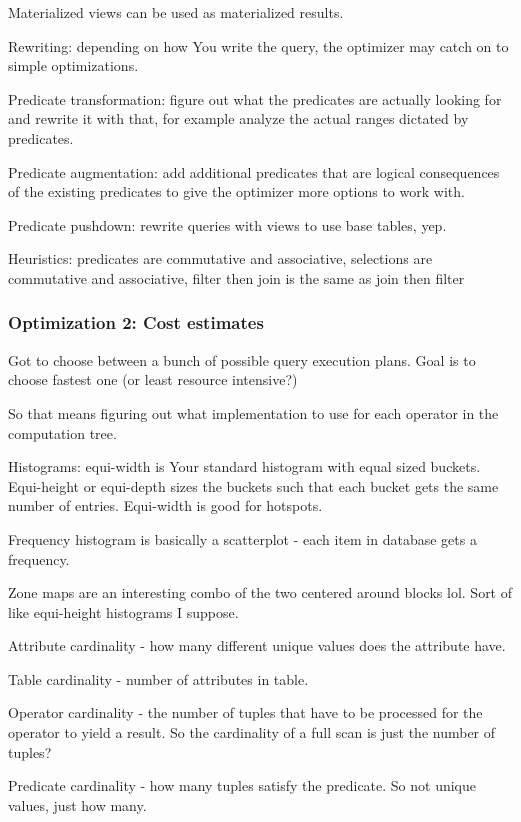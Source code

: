 \documentclass{article}
\begin{document}
			Materialized views can be used as materialized results. 
			
			Rewriting: depending on how You write the query, the optimizer may catch on to simple optimizations.
			
			Predicate transformation: figure out what the predicates are actually looking for and rewrite it with that, for example analyze the actual ranges dictated by predicates.
			
			Predicate augmentation: add additional predicates that are logical consequences of the existing predicates to give the optimizer more options to work with. 
			
			Predicate pushdown: rewrite queries with views to use base tables, yep.
			
			Heuristics: predicates are commutative and associative, selections are commutative and associative, filter then join is the same as join then filter
			
		\subsubsection{Optimization 2: Cost estimates}
		
			Got to choose between a bunch of possible query execution plans. Goal is to choose fastest one (or least resource intensive?)
			
			So that means figuring out what implementation to use for each operator in the computation tree.
			
			Histograms: equi-width is Your standard histogram with equal sized buckets. Equi-height or equi-depth sizes the buckets such that each bucket gets the same number of entries. Equi-width is good for hotspots. 
			
			Frequency histogram is basically a scatterplot - each item in database gets a frequency.
			
			Zone maps are an interesting combo of the two centered around blocks lol. Sort of like equi-height histograms I suppose.
			
			Attribute cardinality - how many different unique values does the attribute have.
			
			Table cardinality - number of attributes in table.
			
			Operator cardinality - the number of tuples that have to be processed for the operator to yield a result. So the cardinality of a full scan is just the number of tuples?
			
			Predicate cardinality - how many tuples satisfy the predicate. So not unique values, just how many.
			
\end{document}
